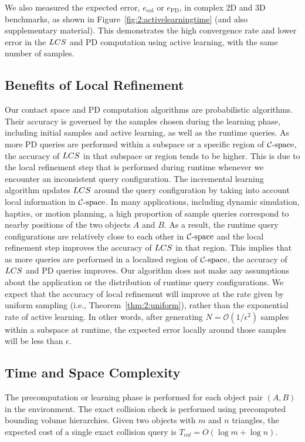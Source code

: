 We also measured the expected error, $e_{\text{col}}$ or $e_{\text{PD}}$, in
complex 2D and 3D benchmarks, as shown in Figure~\ref{fig:2:activelearningtime} (and also supplementary material).
This demonstrates the high convergence rate and lower error in the $LCS$ and PD computation using active learning, with the same number
of samples.

\subsection{Benefits of Local Refinement}
Our contact space and PD computation algorithms are probabilistic algorithms. Their accuracy is governed by
the samples chosen during the learning phase, including initial samples and active learning, as well as
the runtime queries. As more PD queries are performed within a subspace or a specific region of $\mathcal C\text{-space}$,
the accuracy of $LCS$ in that subspace or region tends to be higher.
This is due to the local refinement step that is performed during runtime whenever we encounter an
inconsistent query configuration.
The incremental learning algorithm updates $LCS$ around the query configuration by taking into account
local information in $\mathcal C\text{-space}$.
In many applications, including dynamic simulation, haptics, or motion planning, a high proportion of
sample queries correspond to nearby positions of the two objects $A$ and $B$. As a result, the runtime
query configurations are relatively close to each other in $\mathcal C\text{-space}$ and the local refinement
step improves the accuracy of $LCS$ in that region. This implies that as more queries are performed in
a localized region of $\mathcal C\text{-space}$, the accuracy of $LCS$ and PD queries improves.
Our algorithm does not make any assumptions about the application or the distribution of runtime query
configurations. We expect that the accuracy of local refinement will improve at the rate given by
uniform sampling (i.e., Theorem~\ref{thm:2:uniform}), rather than the exponential rate of active learning.
In other words, after generating $N = \mathcal O(1/\epsilon^2)$ samples within a subspace at runtime,
the expected error locally around those samples will be less than $\epsilon$.


\subsection{Time and Space Complexity}
\label{sec:2:analysis:timespacecomplexity}
The precomputation or learning phase is performed for each object pair $(A, B)$
in the environment. The exact collision check is performed using precomputed bounding volume hierarchies.
Given two objects with $m$ and $n$ triangles, the expected cost of a single
exact collision query is $T_{col} = O(\log m + \log n)$.

